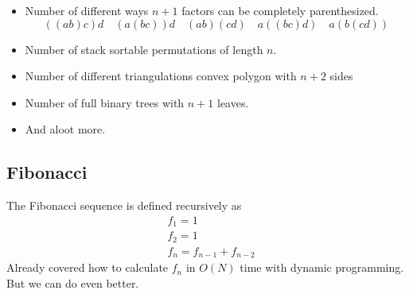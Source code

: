 \documentclass[12pt,t]{beamer}
\newcommand{\bi}{\begin{itemize}}
\newcommand{\ei}{\end{itemize}}
\def\hepta{\draw[foreground](A) -- (B) -- (C) -- (D) -- (E) -- (F) -- (G) -- cycle;}
\newcommand{\slice}[1]{%
    \hepta
    \draw[foreground] \foreach \x/\y in {#1} {(\x)--(\y)};
}
\begin{document}
\begin{frame}
  \bi
    \item Number of different ways $n+1$ factors can be completely parenthesized.
      \[
        ((ab)c)d\quad(a(bc))d\quad(ab)(cd)\quad a((bc)d)\quad a(b(cd))
      \]
    \item Number of stack sortable permutations of length $n$.
    \item Number of different triangulations convex polygon with $n+2$ sides
      \begin{figure}
      \end{figure}
    \item Number of full binary trees with $n+1$ leaves.
    \item And aloot more.
  \ei
\end{frame}

\subsection{Fibonacci}
\begin{frame}
  The Fibonacci sequence is defined recursively as
  \begin{align*}
    &f_1 = 1\\
    &f_2 = 1\\
    &f_n = f_{n-1} + f_{n-2}
  \end{align*}
  Already covered how to calculate $f_n$ in $O(N)$ time with dynamic programming.\\
  But we can do even better.
\end{frame}
\end{document}
